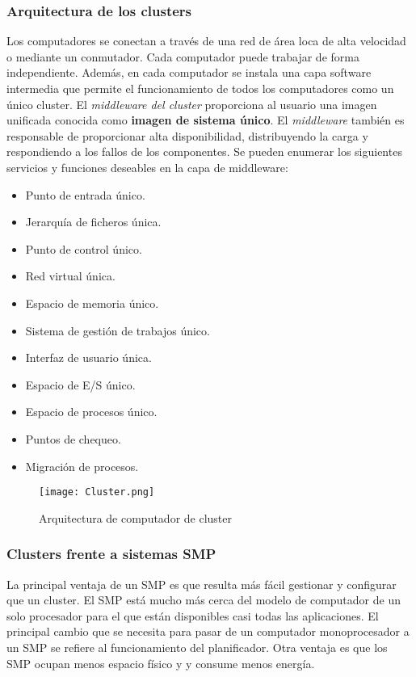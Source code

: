 \subsubsection*{Arquitectura de los clusters}

Los computadores se conectan a través de una red de área loca de alta velocidad o mediante un conmutador. Cada computador puede trabajar de forma independiente. Además, en cada computador se instala una capa software intermedia que permite el funcionamiento de todos los computadores como un único cluster. El \textit{middleware del cluster} proporciona al usuario una imagen unificada conocida como \textbf{imagen de sistema único}. El \textit{middleware} también es responsable de proporcionar alta disponibilidad, distribuyendo la carga y respondiendo a los fallos de los componentes. Se pueden enumerar los siguientes servicios y funciones deseables en la capa de middleware:

\begin{itemize}
  \item Punto de entrada único.
  \item Jerarquía de ficheros única.
  \item Punto de control único.
  \item Red virtual única.
  \item Espacio de memoria único.
  \item Sistema de gestión de trabajos único.
  \item Interfaz de usuario única.
  \item Espacio de E/S único.
  \item Espacio de procesos único.
  \item Puntos de chequeo.
  \item Migración de procesos.
\end{itemize}

\begin{figure}[H]
  \centering
  \texttt{[image: Cluster.png]}
  \caption{Arquitectura de computador de cluster}
\end{figure}

\subsubsection*{Clusters frente a sistemas SMP}

La principal ventaja de un SMP es que resulta más fácil gestionar y configurar que un cluster. El SMP está mucho más cerca del modelo de computador de un solo procesador para el que están disponibles casi todas las aplicaciones. El principal cambio que se necesita para pasar de un computador monoprocesador a un SMP se refiere al funcionamiento del planificador. Otra ventaja es que los SMP ocupan menos espacio físico y y consume menos energía.

